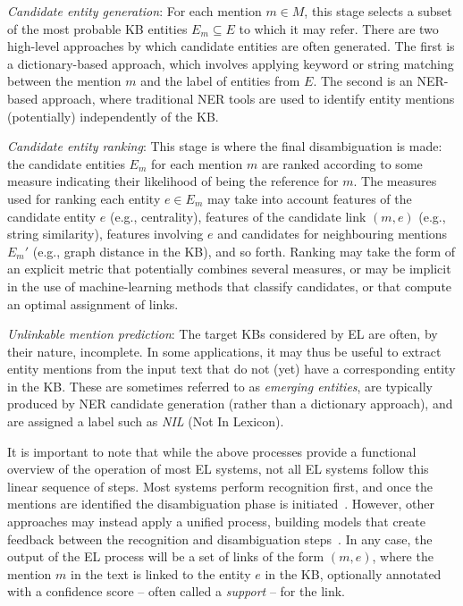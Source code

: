 \documentclass{llncs}
\begin{document}
\begin{description}
\item \textit{Candidate entity generation}:
For each mention $m\in{}M$, this stage selects a subset of the most probable KB entities $E_m \subseteq E$ to which it may refer. There are two high-level approaches by which candidate entities are often generated. The first is a dictionary-based approach, which involves applying keyword or string matching between the mention $m$ and the label of entities from $E$. The second is an NER-based approach, where traditional NER tools are used to identify entity mentions (potentially) independently of the KB.

\item \textit{Candidate entity ranking}: This stage is where the final disambiguation is made: the candidate entities $E_m$ for each mention $m$ are ranked according to some measure indicating their likelihood of being the reference for $m$. The measures used for ranking each entity $e \in E_m$ may take into account features of the candidate entity $e$ (e.g., centrality), features of the candidate link $(m,e)$ (e.g., string similarity), features involving $e$ and candidates for neighbouring mentions $E_m'$ (e.g., graph distance in the KB), and so forth. Ranking may take the form of an explicit metric that potentially combines several measures, or may be implicit in the use of machine-learning methods that classify candidates, or that compute an optimal assignment of links.

\item \textit{Unlinkable mention prediction}: The target KBs considered by EL are often, by their nature, incomplete. In some applications, it may thus be useful to extract entity mentions from the input text that do not (yet) have a corresponding entity in the KB. These are sometimes referred to as \textit{emerging entities}, are typically produced by NER candidate generation (rather than a dictionary approach), and are assigned a label such as \textit{NIL} (Not In Lexicon). 
\end{description}

It is important to note that while the above processes provide a functional overview of the operation of most EL systems, not all EL systems follow this linear sequence of steps. Most systems perform recognition first, and once the mentions are identified the disambiguation phase is initiated~\cite{mendes2011dbpedia,Babelfy-moro2014entity}. However, other approaches may instead apply a unified process, building models that create feedback between the recognition and disambiguation steps~\cite{joinapproach2015}. In any case, the output of the EL process will be a set of links of the form $(m,e)$, where the mention $m$ in the text is linked to the entity $e$ in the KB, optionally annotated with a confidence score -- often called a \textit{support} --  for the link.
\end{document}
